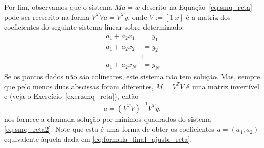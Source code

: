 Por fim, observamos que o sistema $Ma = w$ descrito na Equação~\eqref{eq:smq_reta} pode ser reescrito na forma $V^TVa = V^Ty$, onde $V := [1~x]$ é a matriz dos coeficientes do seguinte sistema linear sobre determinado:
\begin{equation}\label{eq:smq_reta2}
  \begin{split}
  a_1 + a_2x_1 &= y_1\\
  a_1 + a_2x_2 &= y_2\\
  &\vdots\\
  a_1 + a_2x_N &= y_N
  \end{split}
\end{equation}
Se os pontos dados não são colineares, este sistema não tem solução. Mas, sempre que pelo menos duas abscissas foram diferentes, $M = V^TV$ é uma matriz invertível e (veja o Exercício~\ref{exer:smq_reta}), então
\begin{equation}\label{eq:sol_smq_reta}
  a = \left(V^TV\right)^{-1}V^Ty,
\end{equation}
nos fornece a chamada solução por mínimos quadrados do sistema \eqref{eq:smq_reta2}. Note que esta é uma forma de obter os coeficientes $a = (a_1, a_2)$ equivalente àquela dada em \eqref{eq:formula_final_ajuste_reta}.


